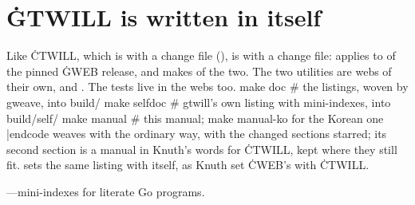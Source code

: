 \chapter{\.{GTWILL} is written in itself}
\noindent Like \.{CTWILL}, which is  with a change file
(),  is  with a change file: 
applies to  of the pinned \.{GWEB} release, and
 makes  of the two. The two utilities are webs of their
own,  and . The tests live in the webs too.
\begincode
make doc        # the listings, woven by gweave, into build/
make selfdoc    # gtwill's own listing with mini-indexes, into build/self/
make manual     # this manual; make manual-ko for the Korean one
|endcode
 weaves  with  the ordinary way, with the
changed sections starred; its second section is a manual in Knuth's words for
\.{CTWILL}, kept where they still fit.  sets the same listing
with  itself, as Knuth set \.{CWEB}'s with \.{CTWILL}.

\vfill
\centerline{---mini-indexes for literate Go programs.}
\bye
